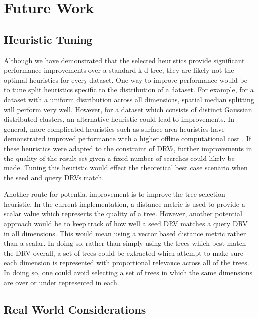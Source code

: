 \chapter{Future Work} %

\label{futurework} %


\section{Heuristic Tuning}

Although we have demonstrated that the selected heuristics provide significant performance improvements over a standard k-d tree, they are likely not the optimal heuristics for every dataset.  One way to improve performance would be to tune split heuristics specific to the distribution of a dataset.  For example, for a dataset with a uniform distribution across all dimensions, spatial median splitting will perform very well.  However, for a dataset which consists of distinct Gaussian distributed clusters, an alternative heuristic could lead to improvements.  In general, more complicated heuristics such as surface area heuristics have demonstrated improved performance with a higher offline computational cost \citep{hunt2006fast}.  If these heuristics were adapted to the constraint of DRVs, further improvements in the quality of the result set given a fixed number of searches could likely be made.  Tuning this heuristic would effect the theoretical best case scenario when the seed and query DRVs match.

Another route for potential improvement is to improve the tree selection heuristic.  In the current implementation, a distance metric is used to provide a scalar value which represents the quality of a tree.  However, another potential approach would be to keep track of how well a seed DRV matches a query DRV in all dimensions.  This would mean using a vector based distance metric rather than a scalar.  In doing so, rather than simply using the trees which best match the DRV overall, a set of trees could be extracted which attempt to make sure each dimension is represented with proportional relevance across all of the trees. In doing so, one could avoid selecting a set of trees in which the same dimensions are over or under represented in each.

\section{Real World Considerations}
\label{sec:realworld}

